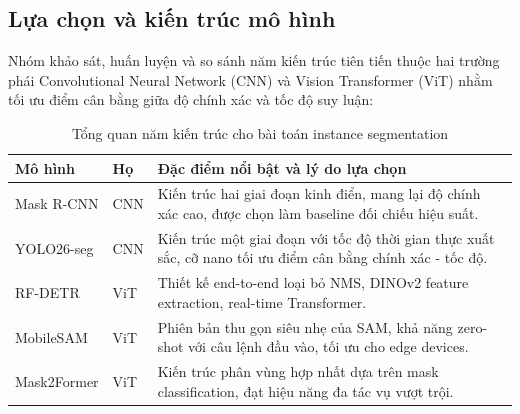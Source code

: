 \subsection{Lựa chọn và kiến trúc mô hình}
\begin{frame}
    \footnotesize
    \justifying
    Nhóm khảo sát, huấn luyện và so sánh năm kiến trúc tiên tiến thuộc hai trường phái Convolutional Neural Network (CNN) và Vision Transformer (ViT) nhằm tối ưu điểm cân bằng giữa độ chính xác và tốc độ suy luận:

    \vspace{0.1cm}
    \begin{table}[h]
        \centering
        \caption{Tổng quan năm kiến trúc cho bài toán instance segmentation}
        \label{tab:slide_model_overview}
        \scriptsize
        \setlength{\tabcolsep}{4pt}
        \begin{tabular}{llp{9.4cm}}
            \toprule
            Mô hình                                                 & Họ  & Đặc điểm nổi bật và lý do lựa chọn                                                                             \\
            \midrule
            Mask R-CNN \cite{he2017mask}                            & CNN & Kiến trúc hai giai đoạn kinh điển, mang lại độ chính xác cao, được chọn làm baseline đối chiếu hiệu suất.      \\
            YOLO26-seg \cite{jocher2023ultralytics,jocher2024yolo} & CNN & Kiến trúc một giai đoạn với tốc độ thời gian thực xuất sắc, cỡ nano tối ưu điểm cân bằng chính xác - tốc độ. \\
            RF-DETR \cite{carion2020end,lv2023detrs}                & ViT & Thiết kế end-to-end loại bỏ NMS, DINOv2 feature extraction, real-time Transformer.                             \\
            MobileSAM \cite{zhang2023faster,kirillov2023segment}    & ViT & Phiên bản thu gọn siêu nhẹ của SAM, khả năng zero-shot với câu lệnh đầu vào, tối ưu cho edge devices.          \\
            Mask2Former \cite{cheng2022masked}                      & ViT & Kiến trúc phân vùng hợp nhất dựa trên mask classification, đạt hiệu năng đa tác vụ vượt trội.                  \\
            \bottomrule
        \end{tabular}
    \end{table}
\end{frame}
